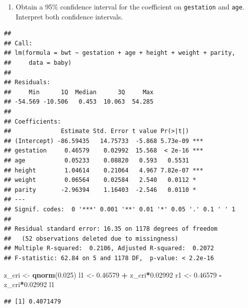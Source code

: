 \documentclass[]{article}
\newenvironment{Shaded}{\begin{snugshade}}{\end{snugshade}}
\newcommand{\FloatTok}[1]{\textcolor[rgb]{0.00,0.00,0.81}{#1}}
\newcommand{\KeywordTok}[1]{\textcolor[rgb]{0.13,0.29,0.53}{\textbf{#1}}}
\newcommand{\NormalTok}[1]{#1}
\newcommand{\OperatorTok}[1]{\textcolor[rgb]{0.81,0.36,0.00}{\textbf{#1}}}
\newcommand{\StringTok}[1]{\textcolor[rgb]{0.31,0.60,0.02}{#1}}
\providecommand{\tightlist}{%
  \setlength{\itemsep}{0pt}\setlength{\parskip}{0pt}}
\begin{document}
\newpage

\begin{enumerate}
\def\labelenumi{\arabic{enumi}.}
\setcounter{enumi}{7}
\tightlist
\item
  Obtain a 95\% confidence interval for the coefficient on
  \texttt{gestation} and \texttt{age}. Interpret both confidence
  intervals.
\end{enumerate}

\begin{Shaded}
\end{Shaded}

\begin{verbatim}
## 
## Call:
## lm(formula = bwt ~ gestation + age + height + weight + parity, 
##     data = baby)
## 
## Residuals:
##     Min      1Q  Median      3Q     Max 
## -54.569 -10.506   0.453  10.063  54.285 
## 
## Coefficients:
##              Estimate Std. Error t value Pr(>|t|)    
## (Intercept) -86.59435   14.75733  -5.868 5.73e-09 ***
## gestation     0.46579    0.02992  15.568  < 2e-16 ***
## age           0.05233    0.08820   0.593   0.5531    
## height        1.04614    0.21064   4.967 7.82e-07 ***
## weight        0.06564    0.02584   2.540   0.0112 *  
## parity       -2.96394    1.16403  -2.546   0.0110 *  
## ---
## Signif. codes:  0 '***' 0.001 '**' 0.01 '*' 0.05 '.' 0.1 ' ' 1
## 
## Residual standard error: 16.35 on 1178 degrees of freedom
##   (52 observations deleted due to missingness)
## Multiple R-squared:  0.2106, Adjusted R-squared:  0.2072 
## F-statistic: 62.84 on 5 and 1178 DF,  p-value: < 2.2e-16
\end{verbatim}

\begin{Shaded}
\begin{Highlighting}[]
\NormalTok{z_cri <-}\StringTok{ }\KeywordTok{qnorm}\NormalTok{(}\FloatTok{0.025}\NormalTok{)}
\NormalTok{l1 <-}\StringTok{ }\FloatTok{0.46579} \OperatorTok{+}\StringTok{ }\NormalTok{z_cri}\OperatorTok{*}\FloatTok{0.02992}
\NormalTok{r1 <-}\StringTok{ }\FloatTok{0.46579} \OperatorTok{-}\StringTok{ }\NormalTok{z_cri}\OperatorTok{*}\FloatTok{0.02992}
\NormalTok{l1}
\end{Highlighting}
\end{Shaded}

\begin{verbatim}
## [1] 0.4071479
\end{verbatim}
\end{document}
